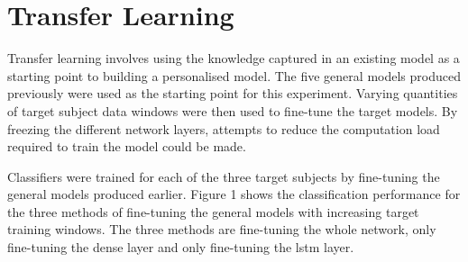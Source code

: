 \section{Transfer Learning}
\label{sec:model-personalisation-results-transfer}
Transfer learning involves using the knowledge captured in an existing model as a starting point to building a personalised model. The five general models produced previously were used as the starting point for this experiment. Varying quantities of target subject data windows were then used to fine-tune the target models. By freezing the different network layers, attempts to reduce the computation load required to train the model could be made.

Classifiers were trained for each of the three target subjects by fine-tuning the general models produced earlier. Figure 1 shows the classification performance for the three methods of fine-tuning the general models with increasing target training windows. The three methods are fine-tuning the whole network, only fine-tuning the dense layer and only fine-tuning the \acrshort{lstm} layer.

